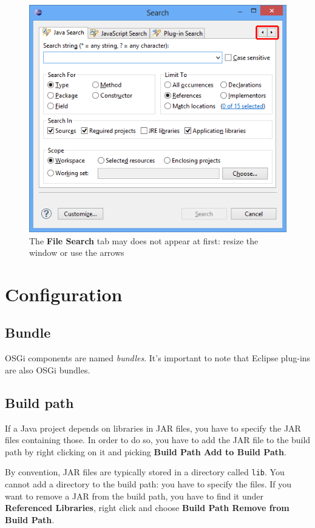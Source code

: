 \documentclass[]{report}
\let\Oldincludegraphics\includegraphics
\renewcommand{\includegraphics}[1]{
\begin{adjustbox}{max size={\textwidth}{\textheight}}
    \Oldincludegraphics[scale=0.6]{#1}%
\end{adjustbox}
}
\begin{document}
\begin{figure}[htbp]
\centering
\includegraphics{img/eclipse_basics/search.png}
\caption{The \textbf{File Search} tab may does not appear at first:
resize the window or use the arrows}
\end{figure}

\section{Configuration}

\subsection{Bundle}

OSGi components are named \emph{bundles}. It's important to note that
Eclipse plug-ins are also OSGi bundles.

\subsection{Build path}

If a Java project depends on libraries in JAR files, you have to specify
the JAR files containing those. In order to do so, you have to add the
JAR file to the build path by right clicking on it and picking
\textbf{Build Path \textbar{} Add to Build Path}.

By convention, JAR files are typically stored in a directory called
\texttt{lib}. You cannot add a directory to the build path: you have to
specify the files. If you want to remove a JAR from the build path, you
have to find it under \textbf{Referenced Libraries}, right click and
choose \textbf{Build Path \textbar{} Remove from Build Path}.
\end{document}
